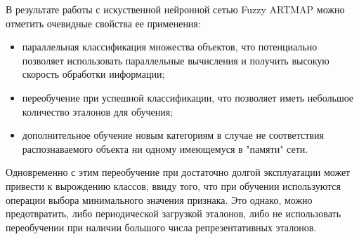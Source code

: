 В результате работы с искуственной нейронной сетью Fuzzy ARTMAP можно отметить очевидные свойства ее применения:
\begin{itemize} \compact
 	\item параллельная классификация множества объектов, что потенциально позволяет использовать параллельные вычисления и получить высокую скорость обработки информации;
 	\item переобучение при успешной классификации, что позволяет иметь небольшое количество эталонов для обучения;
 	\item дополнительное обучение новым категориям в случае не соответствия распознаваемого объекта ни одному имеющемуся в "памяти" сети.
\end{itemize} 

Одновременно с этим переобучение при достаточно долгой эксплуатации может привести к вырождению классов, ввиду того, что при обучении используются операции выбора минимального значения признака. Это однако, можно предотвратить, либо периодической загрузкой эталонов, либо не использовать переобучении при наличии большого числа репрезентативных эталонов.



